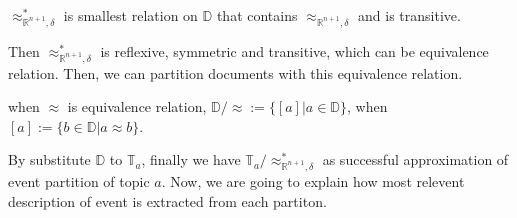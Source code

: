 \begin{definition}
    $\approx_{\mathbb{R}^{n+1}, \delta}^{*}$ is smallest relation on $\mathbb{D}$ that contains $\approx_{\mathbb{R}^{n+1}, \delta}$ and is transitive.
\end{definition}

Then $\approx_{\mathbb{R}^{n+1}, \delta}^{*}$ is reflexive, symmetric and transitive, which can be equivalence relation. Then, we can partition
documents with this equivalence relation.

\begin{definition}
    when $\approx$ is equivalence relation, $\mathbb{D}/\approx := \{[a] | a \in \mathbb{D}\}$, when $[a] := \{b \in \mathbb{D} | a \approx b \}$.
\end{definition}

By substitute $\mathbb{D}$ to $\mathbb{T}_{a}$, finally we have $\mathbb{T}_{a}/\approx_{\mathbb{R}^{n+1}, \delta}^{*}$ as successful approximation 
of event partition of topic $a$. Now, we are going to explain how most relevent description of event is extracted from each partiton.